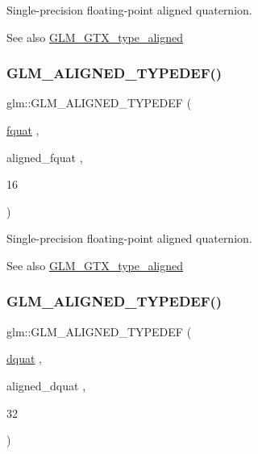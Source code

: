 Single-\/precision floating-\/point aligned quaternion. \begin{DoxySeeAlso}{See also}
\mbox{\hyperlink{group__gtx__type__aligned}{G\+L\+M\+\_\+\+G\+T\+X\+\_\+type\+\_\+aligned}} 
\end{DoxySeeAlso}
\mbox{\label{group__gtx__type__aligned_gad8c4bfacff70e57dc8303634c8bfce35}} 
\subsubsection{\texorpdfstring{GLM\_ALIGNED\_TYPEDEF()}{GLM\_ALIGNED\_TYPEDEF()}\hspace{0.1cm}{\footnotesize\ttfamily [206/209]}}
{\footnotesize\ttfamily glm\+::\+G\+L\+M\+\_\+\+A\+L\+I\+G\+N\+E\+D\+\_\+\+T\+Y\+P\+E\+D\+EF (\begin{DoxyParamCaption}\item[{\mbox{\hyperlink{namespaceglm_aa95d73f08018f3864c6ae08dbf1c59f2}{fquat}}}]{,  }\item[{aligned\+\_\+fquat}]{,  }\item[{16}]{ }\end{DoxyParamCaption})}

Single-\/precision floating-\/point aligned quaternion. \begin{DoxySeeAlso}{See also}
\mbox{\hyperlink{group__gtx__type__aligned}{G\+L\+M\+\_\+\+G\+T\+X\+\_\+type\+\_\+aligned}} 
\end{DoxySeeAlso}
\mbox{\label{group__gtx__type__aligned_gaabc28c84a3288b697605d4688686f9a9}} 
\subsubsection{\texorpdfstring{GLM\_ALIGNED\_TYPEDEF()}{GLM\_ALIGNED\_TYPEDEF()}\hspace{0.1cm}{\footnotesize\ttfamily [207/209]}}
{\footnotesize\ttfamily glm\+::\+G\+L\+M\+\_\+\+A\+L\+I\+G\+N\+E\+D\+\_\+\+T\+Y\+P\+E\+D\+EF (\begin{DoxyParamCaption}\item[{\mbox{\hyperlink{namespaceglm_a49693161673a003b4a8fd4d8b15b0b7b}{dquat}}}]{,  }\item[{aligned\+\_\+dquat}]{,  }\item[{32}]{ }\end{DoxyParamCaption})}

